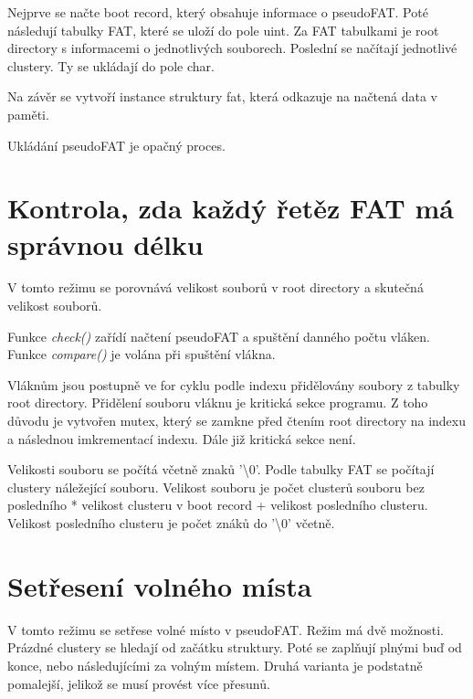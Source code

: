 Nejprve se načte boot record, který obsahuje informace o pseudoFAT. Poté následují tabulky FAT, které se uloží do pole uint. Za FAT tabulkami je root directory s informacemi o jednotlivých souborech. Poslední se načítají jednotlivé clustery. Ty se ukládají do pole char.

Na závěr se vytvoří instance struktury fat, která odkazuje na načtená data v paměti.

Ukládání pseudoFAT je opačný proces.



\chapter{Kontrola, zda každý řetěz FAT má správnou délku}

V tomto režimu se porovnává velikost souborů v root directory a skutečná velikost souborů.

Funkce \emph{check()} zařídí načtení pseudoFAT a spuštění danného počtu vláken. Funkce \emph{compare()} je volána při spuštění vlákna.

Vláknům jsou postupně ve for cyklu podle indexu přidělovány soubory z tabulky root directory. Přidělení souboru vláknu je kritická sekce programu. Z toho důvodu je vytvořen mutex, který se zamkne před čtením root directory na indexu a následnou imkrementací indexu. Dále již kritická sekce není.

Velikosti souboru se počítá včetně znaků '\textbackslash0'. Podle tabulky FAT se počítají clustery náležející souboru. Velikost souboru je počet clusterů souboru bez posledního * velikost clusteru v boot record + velikost posledního clusteru. Velikost posledního clusteru je počet znáků do '\textbackslash0' včetně.


\chapter{Setřesení volného místa}

V tomto režimu se setřese volné místo v pseudoFAT. Režim má dvě možnosti. Prázdné clustery se hledají od začátku struktury. Poté se zaplňují plnými buď od konce, nebo následujícími za volným místem. Druhá varianta je podstatně pomalejší, jelikož se musí provést více přesunů.

